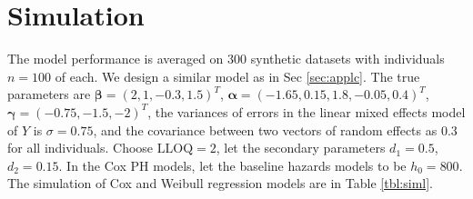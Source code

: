 \section{Simulation}
\label{sec:simul}

The model performance is averaged on $300$ synthetic datasets with individuals $n=100$ of each. We design a similar model as in Sec \ref{sec:applc}. The true parameters are $\boldsymbol{\beta}=(2,1,-0.3,1.5)^T$, $\boldsymbol{\alpha}=(-1.65,0.15,1.8,-0.05,0.4)^T$, $\boldsymbol{\gamma}=(-0.75,-1.5,-2)^T$, the variances of errors in the linear mixed effects model of $Y$ is $\sigma=0.75$, and the covariance between two vectors of random effects as $0.3$ for all individuals. Choose $\text{LLOQ}=2$, let the secondary parameters $d_1=0.5$, $d_2=0.15$. In the Cox PH models, let the baseline hazards models to be $h_0=800$. The simulation of Cox and Weibull regression models are in Table \ref{tbl:siml}.

